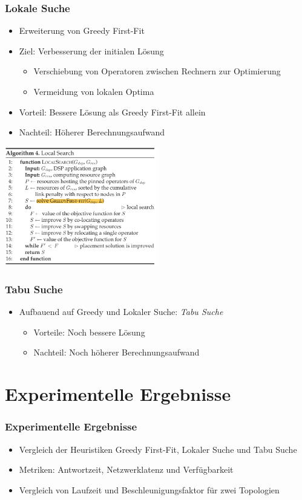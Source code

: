 \documentclass{beamer}
\begin{document}
\begin{frame}
\frametitle{Lokale Suche}
\begin{itemize}
    \item Erweiterung von Greedy First-Fit
    \item Ziel: Verbesserung der initialen Lösung
    \begin{itemize}
        \item Verschiebung von Operatoren zwischen Rechnern zur Optimierung
        \item Vermeidung von lokalen Optima
    \end{itemize}
    \item Vorteil: Bessere Lösung als Greedy First-Fit allein
    \item Nachteil: Höherer Berechnungsaufwand
\end{itemize}
\includegraphics[width=0.5\textwidth]{res/algorithmus-lokale-suche.png}
\end{frame}

\begin{frame}
\frametitle{Tabu Suche}
\begin{itemize}
    \item Aufbauend auf Greedy und Lokaler Suche: \textit{Tabu Suche}
    \begin{itemize}
        \item Vorteile: Noch bessere Lösung
        \item Nachteil: Noch höherer Berechnungsaufwand
    \end{itemize}
\end{itemize}
\end{frame}

\section{Experimentelle Ergebnisse}
\begin{frame}
\frametitle{Experimentelle Ergebnisse}
\begin{itemize}
    \item Vergleich der Heuristiken Greedy First-Fit, Lokaler Suche und Tabu Suche
    \item Metriken: Antwortzeit, Netzwerklatenz und Verfügbarkeit
    \item Vergleich von Laufzeit und Beschleunigungsfaktor für zwei Topologien
\end{itemize}
\vspace{0.3cm}
\end{frame}
\end{document}
